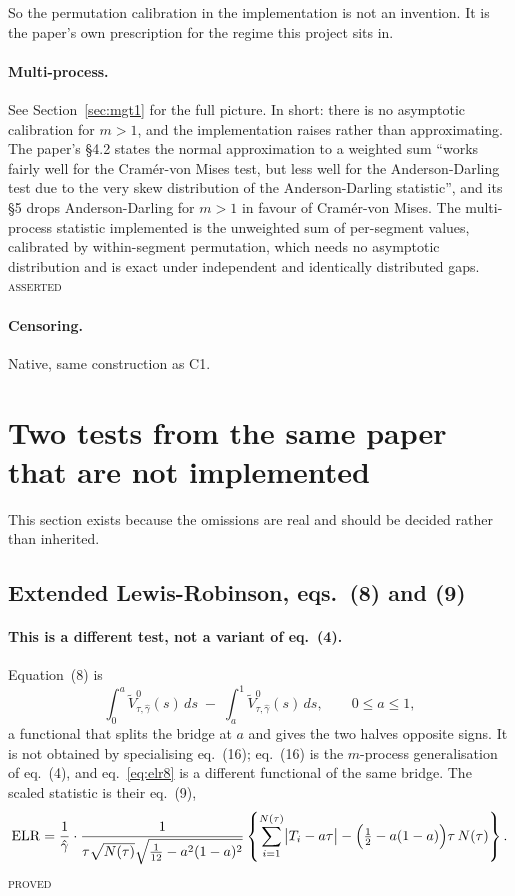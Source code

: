 \documentclass[11pt,a4paper]{article}
\newcommand{\Vtilde}{\widetilde{V}^{0}_{\tau,\hat\gamma}}
\newcommand{\gh}{\hat\gamma}
\newcommand{\Ntau}{N(\tau)}
\newcommand{\PROVED}{\textsc{\textcolor{blue!55!black}{proved}}}
\newcommand{\ASSERTED}{\textsc{\textcolor{purple!70!black}{asserted}}}
\begin{document}
So the permutation calibration in the implementation is not an invention. It is the
paper's own prescription for the regime this project sits in.

\paragraph{Multi-process.} See Section~\ref{sec:mgt1} for the full picture. In short:
there is no asymptotic calibration for $m > 1$, and the implementation raises rather than
approximating. The paper's \S 4.2 states the normal
approximation to a weighted sum \enquote{works fairly well for the Cramér-von Mises
test, but less well for the Anderson-Darling test due to the very skew distribution of
the Anderson-Darling statistic}, and its \S 5 drops Anderson-Darling for $m > 1$ in
favour of Cramér-von Mises. The multi-process statistic implemented is the unweighted
sum of per-segment values, calibrated by within-segment permutation, which needs no
asymptotic distribution and is exact under independent and identically distributed
gaps. \ASSERTED

\paragraph{Censoring.} Native, same construction as C1.

\section{Two tests from the same paper that are not implemented}
\label{sec:missing}

This section exists because the omissions are real and should be decided rather than
inherited.

\subsection{Extended Lewis-Robinson, eqs.~(8) and (9)}

\paragraph{This is a different test, not a variant of eq.~(4).} Equation~(8) is
%
\begin{equation}
\int_0^a \Vtilde(s)\,ds \;-\; \int_a^1 \Vtilde(s)\,ds ,
\qquad 0 \le a \le 1,
\label{eq:elr8}
\end{equation}
%
a functional that splits the bridge at $a$ and gives the two halves opposite signs. It
is not obtained by specialising eq.~(16); eq.~(16) is the $m$-process generalisation of
eq.~(4), and eq.~\eqref{eq:elr8} is a different functional of the same bridge. The
scaled statistic is their eq.~(9),
%
\begin{equation}
\mathrm{ELR} = \frac{1}{\gh}\cdot
\frac{1}{\tau\sqrt{\Ntau}\sqrt{\tfrac{1}{12} - a^2(1-a)^2}}
\left\{\sum_{i=1}^{\Ntau}\bigl|T_i - a\tau\bigr|
- \Bigl(\tfrac{1}{2} - a(1-a)\Bigr)\tau\,\Ntau\right\}.
\label{eq:elr9}
\end{equation}
\PROVED
\end{document}
